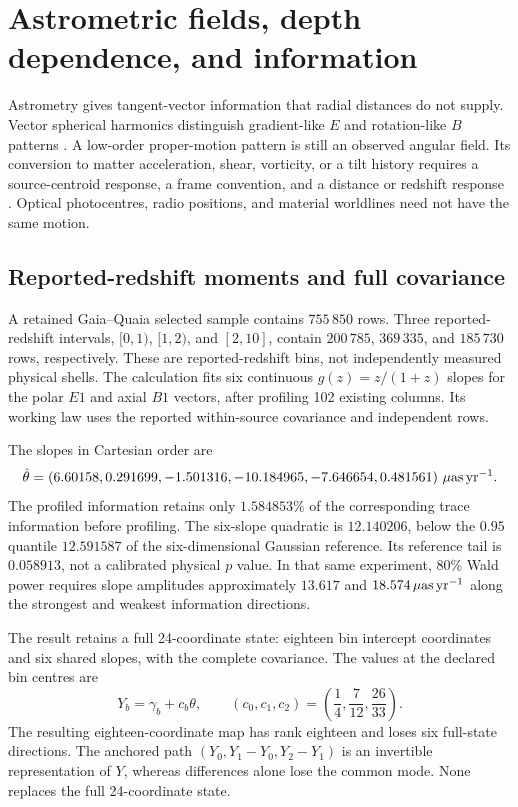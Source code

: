 \section{Astrometric fields, depth dependence, and information}
\label{sec:astrometry}

Astrometry gives tangent-vector information that radial distances do not supply. Vector spherical harmonics distinguish gradient-like $E$ and rotation-like $B$ patterns \cite{MignardKlioner2012}. A low-order proper-motion pattern is still an observed angular field. Its conversion to matter acceleration, shear, vorticity, or a tilt history requires a source-centroid response, a frame convention, and a distance or redshift response \cite{GaiaCRF3}. Optical photocentres, radio positions, and material worldlines need not have the same motion.

\subsection{Reported-redshift moments and full covariance}

A retained Gaia--Quaia selected sample contains $755\,850$ rows. Three reported-redshift intervals, $[0,1)$, $[1,2)$, and $[2,10]$, contain $200\,785$, $369\,335$, and $185\,730$ rows, respectively. These are reported-redshift bins, not independently measured physical shells. The calculation fits six continuous $g(z)=z/(1+z)$ slopes for the polar $E1$ and axial $B1$ vectors, after profiling 102 existing columns. Its working law uses the reported within-source covariance and independent rows.

The slopes in Cartesian order are
\begin{equation}
 \hat\theta=(6.60158,0.291699,-1.501316,
 -10.184965,-7.646654,0.481561)\ \mu\mathrm{as}\,\mathrm{yr}^{-1}.
\end{equation}
The profiled information retains only $1.584853\%$ of the corresponding trace information before profiling. The six-slope quadratic is $12.140206$, below the $0.95$ quantile $12.591587$ of the six-dimensional Gaussian reference. Its reference tail is $0.058913$, not a calibrated physical $p$ value. In that same experiment, 80\% Wald power requires slope amplitudes approximately $13.617$ and $18.574\,\mu\mathrm{as}\,\mathrm{yr}^{-1}$ along the strongest and weakest information directions.

The result retains a full 24-coordinate state: eighteen bin intercept coordinates and six shared slopes, with the complete covariance. The values at the declared bin centres are
\begin{equation}
 Y_b=\gamma_b+c_b\theta,\qquad
 (c_0,c_1,c_2)=\left(\frac14,\frac7{12},\frac{26}{33}\right).
 \label{eq:depthmap}
\end{equation}
The resulting eighteen-coordinate map has rank eighteen and loses six full-state directions. The anchored path $(Y_0,Y_1-Y_0,Y_2-Y_1)$ is an invertible representation of $Y$, whereas differences alone lose the common mode. None replaces the full 24-coordinate state.

